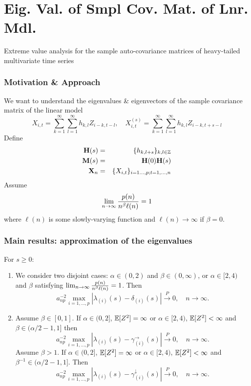 \documentclass{beamer}
\begin{document}
\section{Eig. Val. of Smpl Cov. Mat. of Lnr. Mdl.}
\begin{frame}
  Extreme value analysis for the sample auto-covariance matrices of
  heavy-tailed multivariate time series
\end{frame}

\begin{frame}
  \frametitle{Motivation \& Approach}
  We want to understand the eigenvalues \& eigenvectors of the sample
  covariance matrix of the linear model
  \[
  X_{i,t} = \sum_{k=1}^\infty \sum_{l=1}^\infty h_{k ,l} Z_{i-k, t-l},
  \quad
  X_{i,t}^{(s)} = \sum_{k=1}^\infty \sum_{l=1}^\infty h_{k ,l} Z_{i-k, t+s-l}
  \]
  Define
  \begin{eqnarray*}
    \mathbf{H}(s) &=& \{h_{k,l+s}\}_{k,l \in \mathbb Z} \\
    \mathbf{M}(s) &=& \mathbf{H}(0) \mathbf{H}(s) \\
    \mathbf{X}_n &=& \{X_{i,t}\}_{i=1\dots,p; t=1,\dots,n}
  \end{eqnarray*}
  Assume
  \[
  \lim_{n \to \infty} {p(n) \over n^\beta \ell(n)} = 1
  \]
  where $\ell(n)$ is some slowly-varying function and $\ell(n) \to \infty$
  if $\beta = 0$.
\end{frame}

\begin{frame}
  \frametitle{Main results: approximation of the eigenvalues}
  \begin{footnotesize}
  For $s\ge 0$:
  \begin{enumerate}
  \item We consider two disjoint cases:
    $\alpha \in (0,2)$ and $\beta\in (0,\infty)$, or
    $\alpha\in [2,4)$ and $\beta$ satisfying
    $\lim_{n \to \infty} {p(n) \over n^\beta \ell(n)} = 1$. Then
    \begin{equation*}
      a_{np}^{-2} \max_{i=1,\ldots,p}
      |\lambda_{(i)}(s)-\delta_{(i)}(s)|
      \overset{P}{\to} 0,
      \quad
      n \to \infty.
    \end{equation*}
  \item
    Assume $\beta\in [0,1]$.
    If $\alpha \in (0,2]$, $\mathbb{E}[Z^2]=\infty$ or $\alpha\in [2,4)$, $\mathbb{E} [Z^2]<\infty$ and $\beta\in (\alpha/2-1,1]$ then
    \begin{equation*}
    a_{np}^{-2} \max_{i=1,\ldots,p} |\lambda_{(i)}(s)-\gamma_{(i)}^\rightarrow(s)| \overset{P}{\to} 0, \quad n \to \infty.
    \end{equation*}
    Assume $\beta>1$. If $\alpha \in (0,2]$, $\mathbb{E}[Z^2]=\infty$ or $\alpha\in [2,4)$, $\mathbb{E} [Z^2]<\infty$ and $\beta^{-1}\in(\alpha/2-1,1]$. Then
      \begin{equation*}
      a_{np}^{-2} \max_{i=1,\ldots,p} |\lambda_{(i)}(s)-\gamma_{(i)}^\downarrow(s)| \overset{P}{\to} 0, \quad n \to \infty.
      \end{equation*}
  \end{enumerate}
  \end{footnotesize}
\end{frame}
\end{document}
